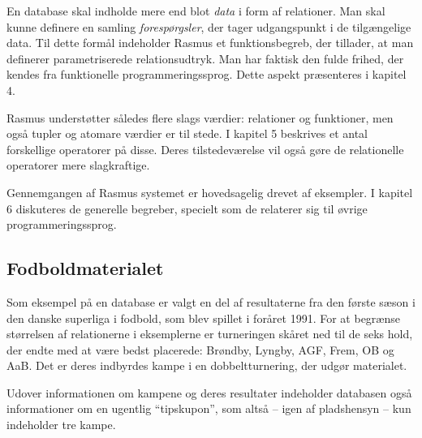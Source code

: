 En database skal indholde mere end blot {\em data\/} i form af relationer.
Man skal kunne definere en samling {\em foresp\o{}rgsler},
der tager udgangspunkt i de tilg\ae{}ngelige data. Til dette 
form\aa{}l indeholder {\sc Rasmus} et funktionsbegreb, der
tillader, at man definerer parametriserede relationsudtryk.
Man har faktisk den fulde frihed, der kendes fra funktionelle
programmeringssprog. Dette aspekt pr\ae{}senteres i kapitel 4.

{\sc Rasmus} underst\o{}tter s\aa{}ledes flere slags v\ae{}rdier:
relationer og funktioner, men ogs\aa{} tupler og atomare
v\ae{}rdier er til stede. I kapitel 5 beskrives et antal forskellige
operatorer p\aa{} disse. Deres tilstedev\ae{}relse vil ogs\aa{}
g\o{}re de relationelle operatorer mere slagkraftige.

Gennemgangen af {\sc Rasmus} systemet er hovedsagelig 
drevet af eksempler. I kapitel 6 diskuteres de
generelle begreber, specielt som de relaterer sig til
\o{}vrige programmeringssprog.

\subsection{Fodboldmaterialet}
Som eksempel p\aa{} en database er valgt en del af resultaterne fra den f\o{}rste
s\ae{}son i den danske superliga i fodbold, som blev spillet i for\aa{}ret 1991.
For at begr\ae{}nse st\o{}rrelsen af relationerne i eksemplerne er
turneringen sk\aa{}ret ned til de seks hold, der endte med at v\ae{}re
bedst placerede: Br\o{}ndby, Lyngby, AGF, Frem, OB og AaB. Det er deres
indbyrdes kampe i en dobbeltturnering, der udg\o{}r materialet.

Udover informationen om kampene og deres resultater indeholder data\-bas\-en
ogs\aa{} informationer om en ugentlig ``tipskupon'', som alts\aa{} -- igen
af plads\-hensyn -- kun indeholder tre kampe.

